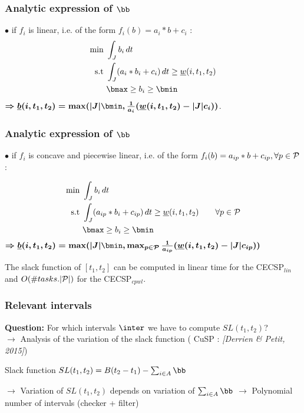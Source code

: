 \begin{frame}
  \frametitle{Analytic expression of $\bb$}
  \vfill
  $\bullet$ if $f_i$ is linear, i.e. of the form $f_i(b)= a_i*b+c_i$ :
  \pause
  \begin{align*}
    \text{min }  & \int_{J} b_i\,dt  \\
    \text{s.t } & \int_{J}(a_i*b_i+c_i)\,dt \ge
                  \underline{w}(i,t_1,t_2)\\
                 & \bmax \ge b_i \ge \bmin
  \end{align*}
  \pause
  { \color{blue!80!black!80}
    $\boldmath{\Rightarrow  \underline{b}(i,t_1,t_2)= \max ( |J|\bmin, \frac{1}{a_i}( \underline{w}(i,t_1,t_2)-|J|c_i))}$}.
  
\end{frame}

\begin{frame}
  \frametitle{Analytic expression of $\bb$}
  \vfill
  $\bullet$  if $f_i$ is concave and piecewise linear, i.e. of the form
  $f_i(b)=a_{ip}*b+c_{ip}, \forall p \in {\cal P}$:
  \pause

  \begin{align*}
    \text{min }  & \int_{J} b_i\,dt  \\
    \text{s.t } & \int_{J}(a_{ip}*b_i+c_{ip})\,dt \ge
                  \underline{w}(i,t_1,t_2) \qquad \forall p \in
                  {\cal P}\\
                 & \bmax \ge b_i \ge \bmin
  \end{align*}
  \pause
  { \color{blue!80!black!80}
    $\boldmath{\Rightarrow  \underline{b}(i,t_1,t_2)= \max ( |J|\bmin, \max_{p
        \in {\cal P}} \frac{1}{a_{ip}}( \underline{w}(i,t_1,t_2)-|J|c_{ip}))}$}
  \vfill
  \begin{prop}
    The slack function of $[t_1,t_2]$ can be computed in linear time
    for the CECSP$_{lin}$ and $O(\#tasks.|{\cal P}|)$ for the CECSP$_{cpwl}$.
  \end{prop}
\end{frame}


\begin{frame}
  \frametitle{Relevant intervals}
  {\bf Question: } For which intervals $\inter$ we have to compute $SL(t_1,t_2)$?\\
  \vfill
  \pause
  $\rightarrow$ Analysis of the variation of the slack function (
  {\small CuSP : \it \color{gray!50!black!50} [Derrien \& Petit, 2015]})\\
  \vfill
  \begin{block}{Slack function}
    \centering $SL(t_1,t_2)=B(t_2-t_1) - \sum_{i \in A} \bb$
  \end{block}
  \vspace{0.8cm}
  $\rightarrow$ Variation of $SL(t_1,t_2)$ depends on variation of 
  $\sum_{i \in A} \bb$
  \vfill 
  $\rightarrow$ Polynomial number of intervals (checker + filter)  \vfill 
\end{frame}

